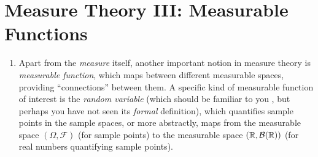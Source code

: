 \section{Measure Theory III: Measurable Functions}
\label{sect:meas-fn}
\begin{enumerate}
\item Apart from the \emph{measure} itself, another important notion in measure
theory is \emph{measurable function}, which maps between different measurable
spaces, providing ``connections'' between them. A specific kind of measurable
function of interest is the \emph{random variable} (which should be familiar to
you , but perhaps you have not seen its
\emph{formal} definition), which quantifies sample points in the sample spaces,
or more abstractly, maps from the measurable space \((\Omega,\mathcal{F})\)
(for sample points) to the measurable space \((\mathbb{R},\mathcal{B}(\mathbb{R}))\) (for real
numbers quantifying sample points).
\end{enumerate}
